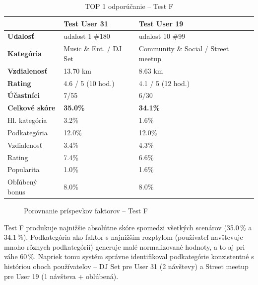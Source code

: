 \begin{table}[H]
\centering
\caption{TOP 1 odporúčanie – Test F}
\label{tab:vysledky_testF}
\small
\begin{tabular}{|l|l|l|}
\hline
 & \textbf{Test User 31} & \textbf{Test User 19} \\ \hline
\textbf{Udalosť}      & udalost 1 \#180         & udalost 10 \#99 \\
\textbf{Kategória}    & Music \& Ent. / DJ Set  & Community \& Social / Street meetup \\
\textbf{Vzdialenosť}  & 13.70 km                & 8.63 km \\
\textbf{Rating}       & 4.6 / 5 (10 hod.)       & 4.1 / 5 (12 hod.) \\
\textbf{Účastníci}    & 7/55                    & 6/30 \\ \hline
\textbf{Celkové skóre} & \textbf{35.0\%}        & \textbf{34.1\%} \\ \hline
Hl. kategória         & 3.2\%                   & 1.6\% \\
Podkategória          & 12.0\%                  & 12.0\% \\
Vzdialenosť           & 3.4\%                   & 4.3\% \\
Rating                & 7.4\%                   & 6.6\% \\
Popularita            & 1.0\%                   & 1.6\% \\
Obľúbený bonus        & 8.0\%                   & 8.0\% \\ \hline
\end{tabular}
\end{table}

\begin{figure}[H]
\centering
{}
\caption{Porovnanie príspevkov faktorov – Test F}
\label{fig:graf_testF}
\end{figure}

Test F produkuje najnižšie absolútne skóre spomedzi všetkých scenárov (35.0\,\% a 34.1\,\%). Podkategória ako faktor s najnižším rozptylom (používateľ navštevuje mnoho rôznych podkategórií) generuje malé normalizované hodnoty, a to aj pri váhe 60\,\%. Napriek tomu systém správne identifikoval podkategórie konzistentné s históriou oboch používateľov – DJ Set pre User 31 (2 návštevy) a Street meetup pre User 19 (1 návšteva + obľúbená).